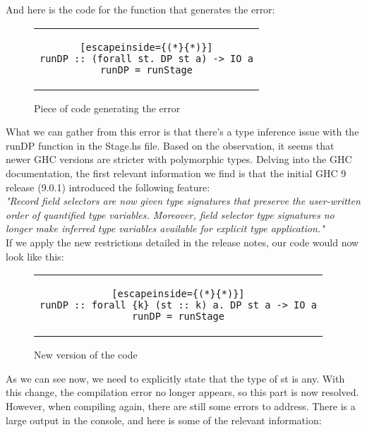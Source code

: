 And here is the code for the function that generates the error:

\begin{figure}[H]
    \begin{tabular}{c}
        \begin{lstlisting}[escapeinside={(*}{*)}]
runDP :: (forall st. DP st a) -> IO a
runDP = runStage
        \end{lstlisting}
    \end{tabular}
    \caption{Piece of code generating the error}
    \label{fig:HC26}
\end{figure}
What we can gather from this error is that there's a type inference issue with the runDP function in the Stage.hs file.
Based on the observation, it seems that newer GHC versions are stricter with polymorphic types.
Delving into the GHC documentation, the first relevant information we find is that the initial GHC 9 release (9.0.1) introduced the following feature: \cite*[][Point 2.1.2.1]{} \\

\textit{"Record field selectors are now given type signatures that preserve the user-written order of quantified type variables.
Moreover, field selector type signatures no longer make inferred type variables available for explicit type application."}  \\

If we apply the new restrictions detailed in the release notes, our code would now look like this:

\begin{figure}[H]
    \begin{tabular}{c}
        \begin{lstlisting}[escapeinside={(*}{*)}]
runDP :: forall {k} (st :: k) a. DP st a -> IO a
runDP = runStage
        \end{lstlisting}
    \end{tabular}
    \caption{New version of the code}
    \label{fig:HC27}
\end{figure}

As we can see now, we need to explicitly state that the type of st is any.
With this change, the compilation error no longer appears, so this part is now resolved.
However, when compiling again, there are still some errors to address.
There is a large output in the console, and here is some of the relevant information:

